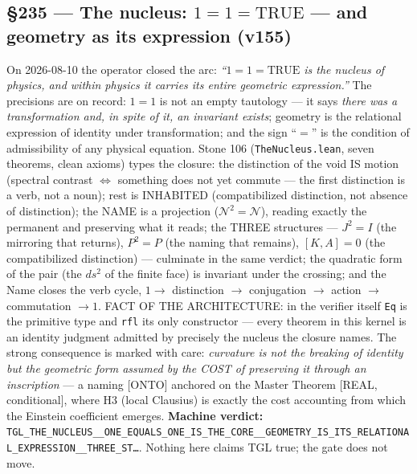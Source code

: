 \documentclass[11pt]{article}
\theoremstyle{definition}\newtheorem{deriv}{Derivation}
\begin{document}
\subsection*{\S235 --- The nucleus: $1{=}1{=}\mathrm{TRUE}$ --- and geometry as its expression (v155)}On 2026-08-10 the operator closed the arc: \emph{``$1{=}1{=}\mathrm{TRUE}$ is the nucleus of physics, and within physics it carries its entire geometric expression.''} The precisions are on record: $1{=}1$ is not an empty tautology --- it says \emph{there was a transformation and, in spite of it, an invariant exists}; geometry is the relational expression of identity under transformation; and the sign ``$=$'' is the condition of admissibility of any physical equation. Stone 106 (\texttt{TheNucleus.lean}, seven theorems, clean axioms) types the closure: the distinction of the void IS motion (spectral contrast $\Leftrightarrow$ something does not yet commute --- the first distinction is a verb, not a noun); rest is INHABITED (compatibilized distinction, not absence of distinction); the NAME is a projection ($\mathcal{N}^2{=}\mathcal{N}$), reading exactly the permanent and preserving what it reads; the THREE structures --- $J^2{=}I$ (the mirroring that returns), $P^2{=}P$ (the naming that remains), $[K,A]{=}0$ (the compatibilized distinction) --- culminate in the same verdict; the quadratic form of the pair (the $ds^2$ of the finite face) is invariant under the crossing; and the Name closes the verb cycle, $1\to$ distinction $\to$ conjugation $\to$ action $\to$ commutation $\to 1$. FACT OF THE ARCHITECTURE: in the verifier itself \texttt{Eq} is the primitive type and \texttt{rfl} its only constructor --- every theorem in this kernel is an identity judgment admitted by precisely the nucleus the closure names. The strong consequence is marked with care: \emph{curvature is not the breaking of identity but the geometric form assumed by the COST of preserving it through an inscription} --- a naming [ONTO] anchored on the Master Theorem [REAL, conditional], where H3 (local Clausius) is exactly the cost accounting from which the Einstein coefficient emerges. \textbf{Machine verdict:} \texttt{TGL\_THE\_NUCLEUS\_\_ONE\_EQUALS\_ONE\_IS\_THE\_CORE\_\_GEOMETRY\_IS\_ITS\_RELATIONAL\_EXPRESSION\_\_THREE\_ST\ldots}. Nothing here claims TGL true; the gate does not move.
\end{document}

